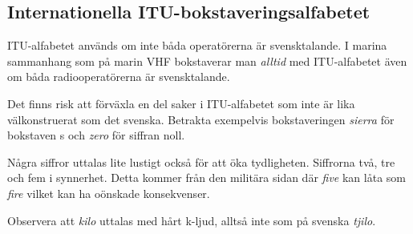 \subsection{Internationella ITU-bokstaveringsalfabetet}

ITU-alfabetet används om inte båda operatörerna är svensktalande. I marina sammanhang som på marin VHF bokstaverar man \textit{alltid} med ITU-alfabetet även om båda radiooperatörerna är svensktalande.

Det finns risk att förväxla en del saker i ITU-alfabetet som inte är lika välkonstruerat som det svenska. Betrakta exempelvis bokstaveringen \textit{sierra} för bokstaven s och \textit{zero} för siffran noll. 

Några siffror uttalas lite lustigt också för att öka tydligheten. Siffrorna två, tre och fem i synnerhet. Detta kommer från den militära sidan där \textit{five} kan låta som \textit{fire} vilket kan ha oönskade konsekvenser.

Observera att \textit{kilo} uttalas med hårt k-ljud, alltså inte som på svenska \textit{tjilo}.

